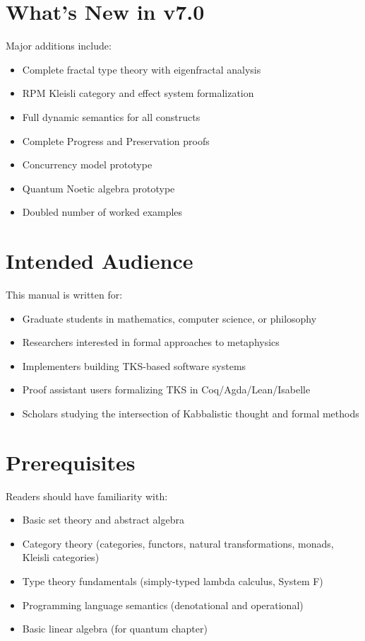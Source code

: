 \documentclass[11pt,twoside,openright]{book}
\theoremstyle{definition}
\theoremstyle{plain}
\theoremstyle{remark}
\begin{document}
\section*{What's New in v7.0}

Major additions include:
\begin{itemize}
  \item Complete fractal type theory with eigenfractal analysis
  \item RPM Kleisli category and effect system formalization
  \item Full dynamic semantics for all constructs
  \item Complete Progress and Preservation proofs
  \item Concurrency model prototype
  \item Quantum Noetic algebra prototype
  \item Doubled number of worked examples
\end{itemize}

\section*{Intended Audience}

This manual is written for:
\begin{itemize}
  \item Graduate students in mathematics, computer science, or philosophy
  \item Researchers interested in formal approaches to metaphysics
  \item Implementers building TKS-based software systems
  \item Proof assistant users formalizing TKS in Coq/Agda/Lean/Isabelle
  \item Scholars studying the intersection of Kabbalistic thought and formal methods
\end{itemize}

\section*{Prerequisites}

Readers should have familiarity with:
\begin{itemize}
  \item Basic set theory and abstract algebra
  \item Category theory (categories, functors, natural transformations, monads, Kleisli categories)
  \item Type theory fundamentals (simply-typed lambda calculus, System F)
  \item Programming language semantics (denotational and operational)
  \item Basic linear algebra (for quantum chapter)
\end{itemize}
\end{document}
